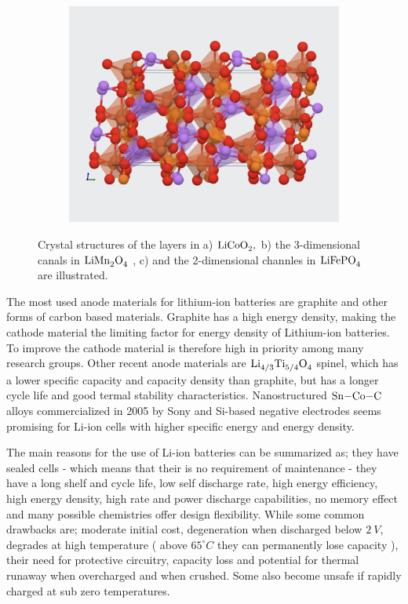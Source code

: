 \begin{figure}[H]
\begin{subfigure}{0.30\textwidth}
        \includegraphics[width=\linewidth]{LiFePO4.png}
        \caption{}
        \label{fig:LiFePO4}
    \end{subfigure}
	\caption{Crystal structures of the layers in a) $\ce{LiCoO_2}, $ \cite{wiki:LiCoO2} b) the 3-dimensional canals in $\ce{LiMn_2O_4}$ \cite{zhang2013understanding}, c) and the 2-dimensional channles in $\ce{LiFePO_4}$ \cite{materialsproject:LiFePO4} are illustrated.}
	\label{fig:Li_a-c}
\end{figure}

The most used anode materials for lithium-ion batteries are graphite and other forms of carbon based materials. Graphite has a high energy density, making the cathode material the limiting factor for energy density of Lithium-ion batteries. To improve the cathode material is therefore high in priority among many research groups. Other recent anode materials are $\ce{Li_{4/3}Ti_{5/4}O_4}$ spinel, which has a lower specific capacity and capacity density than graphite, but has a longer cycle life and good termal stability characteristics. Nanostructured $\ce{Sn-Co-C}$ alloys commercialized in 2005 by Sony and Si-based negative electrodes seems promising for Li-ion cells with higher specific energy and energy density.

The main reasons for the use of Li-ion batteries can be summarized as; they have sealed cells - which means that their is no requirement of maintenance - they have a long shelf and cycle life, low self discharge rate, high energy efficiency, high energy density, high rate and power discharge capabilities, no memory effect and many possible chemistries offer design flexibility. While some common drawbacks are; moderate initial cost, degeneration when discharged below $\SI{2}{V}$, degrades at high temperature ( above $65^{\circ}\si{C}$ they can permanently lose capacity ), their need for protective circuitry, capacity loss and potential for thermal runaway when overcharged and when crushed. Some also become unsafe if rapidly charged at sub zero temperatures.

